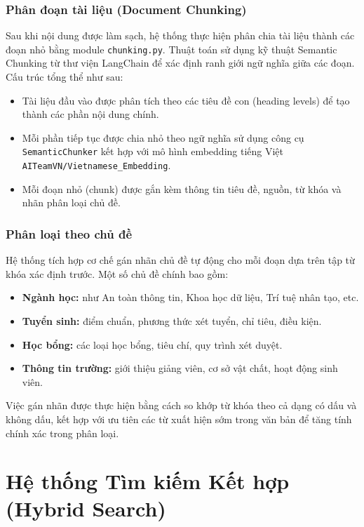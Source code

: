 \subsubsection{Phân đoạn tài liệu (Document Chunking)}

Sau khi nội dung được làm sạch, hệ thống thực hiện phân chia tài liệu thành các đoạn nhỏ bằng module \texttt{chunking.py}. Thuật toán sử dụng kỹ thuật Semantic Chunking từ thư viện LangChain để xác định ranh giới ngữ nghĩa giữa các đoạn. Cấu trúc tổng thể như sau:

\begin{itemize}
    \item Tài liệu đầu vào được phân tích theo các tiêu đề con (heading levels) để tạo thành các phần nội dung chính.
    \item Mỗi phần tiếp tục được chia nhỏ theo ngữ nghĩa sử dụng công cụ \texttt{Semantic\allowbreak{}Chunker} kết hợp với mô hình embedding tiếng Việt \texttt{AITeamVN/\allowbreak{}Vietnamese\_\allowbreak{}Embedding}.
    \item Mỗi đoạn nhỏ (chunk) được gắn kèm thông tin tiêu đề, nguồn, từ khóa và nhãn phân loại chủ đề.
\end{itemize}

\subsubsection{Phân loại theo chủ đề}

Hệ thống tích hợp cơ chế gán nhãn chủ đề tự động cho mỗi đoạn dựa trên tập từ khóa xác định trước. Một số chủ đề chính bao gồm:

\begin{itemize}
    \item \textbf{Ngành học:} như An toàn thông tin, Khoa học dữ liệu, Trí tuệ nhân tạo, etc.
    \item \textbf{Tuyển sinh:} điểm chuẩn, phương thức xét tuyển, chỉ tiêu, điều kiện.
    \item \textbf{Học bổng:} các loại học bổng, tiêu chí, quy trình xét duyệt.
    \item \textbf{Thông tin trường:} giới thiệu giảng viên, cơ sở vật chất, hoạt động sinh viên.
\end{itemize}

Việc gán nhãn được thực hiện bằng cách so khớp từ khóa theo cả dạng có dấu và không dấu, kết hợp với ưu tiên các từ xuất hiện sớm trong văn bản để tăng tính chính xác trong phân loại.

\section{Hệ thống Tìm kiếm Kết hợp (Hybrid Search)}

